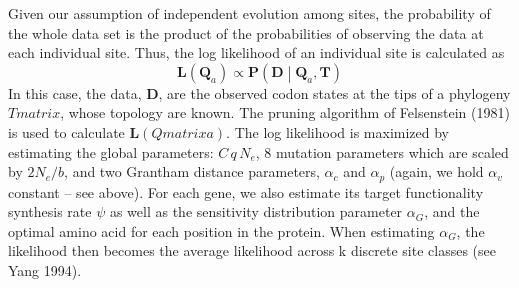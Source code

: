 \documentclass{article}
\newcommand{\Ne}{\ensuremath{{N_e}}\xspace} %
\newcommand{\Pmatrix}{\mathbf{P}\xspace}
\newcommand{\Tmatrix}{\mathbf{T}\xspace}
\newcommand{\Dmatrix}{\mathbf{D}\xspace}
\newcommand{\Lmatrix}{\mathbf{L}\xspace}
\newcommand{\Qmatrix}{\mathbf{Q}\xspace}
\newcommand{\Qmatrixa}{\ensuremath{\Qmatrix_a}\xspace}
\newcommand{\alphac}{\ensuremath{\alpha_c}\xspace}
\newcommand{\alphag}{\ensuremath{\alpha_G}\xspace}
\newcommand{\alphap}{\ensuremath{\alpha_p}\xspace}
\newcommand{\alphav}{\ensuremath{\alpha_v}\xspace}
\begin{document}
Given our assumption of independent evolution among sites, the probability of the whole data set is the product of the probabilities of observing the data at each individual site. 
Thus, the log likelihood of an individual site is calculated as 
\begin{equation}
\Lmatrix\left(\Qmatrixa\right) \propto \Pmatrix\left(\Dmatrix\middle|\Qmatrixa,\Tmatrix\right)
\end{equation}
In this case, the data, $\Dmatrix$, are the observed codon states at the tips of a phylogeny $Tmatrix$, whose topology are known. 
The pruning algorithm of Felsenstein (1981) is used to calculate $\Lmatrix(Qmatrixa)$. 
The log likelihood is maximized by estimating the global parameters: $C \, q \, \Ne$, 8 mutation parameters which are scaled by $2 \Ne/b$, and two Grantham distance parameters, $\alphac$ and $\alphap$ (again, we hold $\alphav$ constant -- see above).
For each gene, we also estimate its target functionality synthesis rate $\psi$ as well as the sensitivity distribution parameter \alphag, and the optimal amino acid for each position in the protein. 
When estimating \alphag, the likelihood then becomes the average likelihood across k discrete site classes (see Yang 1994).





\end{document}
